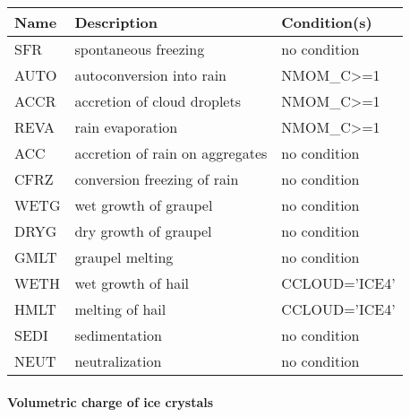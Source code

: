 \begin{longtable} {|p{}|p{}|p{}|}
\hline
Name & Description & Condition(s) \\
\hline \hline
\endhead
SFR    & spontaneous freezing            & no condition \\\hline
AUTO   & autoconversion into rain        & NMOM\_C>=1 \\\hline
ACCR   & accretion of cloud droplets     & NMOM\_C>=1 \\\hline
REVA   & rain evaporation                & NMOM\_C>=1 \\\hline
ACC    & accretion of rain on aggregates & no condition \\\hline
CFRZ   & conversion freezing of rain     & no condition \\\hline
WETG   & wet growth of graupel           & no condition \\\hline
DRYG   & dry growth of graupel           & no condition \\\hline
GMLT   & graupel melting                 & no condition \\\hline
WETH   & wet growth of hail              & CCLOUD='ICE4' \\\hline
HMLT   & melting of hail                 & CCLOUD='ICE4' \\\hline
SEDI   & sedimentation                   & no condition \\\hline
NEUT   & neutralization                  & no condition \\\hline
\end{longtable}

\paragraph{Volumetric charge of ice crystals}
\mbox{} %

